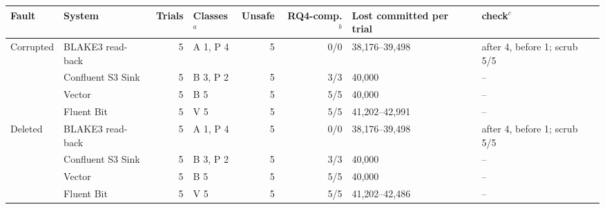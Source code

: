 
\begin{tabular}{@{}llrlrrll@{}}
\toprule
Fault & System & Trials & Classes$^a$ & Unsafe & RQ4-comp.$^b$ & Lost committed per trial & \sysname{} check$^c$ \\
\midrule
Corrupted & \sysname{} BLAKE3 read-back & 5 & A 1, P 4 & 5 & 0/0 & 38{,}176--39{,}498 & after 4, before 1; scrub 5/5 \\
 & Confluent S3 Sink & 5 & B 3, P 2 & 5 & 3/3 & 40{,}000 & -- \\
 & Vector & 5 & B 5 & 5 & 5/5 & 40{,}000 & -- \\
 & Fluent Bit & 5 & V 5 & 5 & 5/5 & 41{,}202--42{,}991 & -- \\
\addlinespace[1pt]
Deleted & \sysname{} BLAKE3 read-back & 5 & A 1, P 4 & 5 & 0/0 & 38{,}176--39{,}498 & after 4, before 1; scrub 5/5 \\
 & Confluent S3 Sink & 5 & B 3, P 2 & 5 & 3/3 & 40{,}000 & -- \\
 & Vector & 5 & B 5 & 5 & 5/5 & 40{,}000 & -- \\
 & Fluent Bit & 5 & V 5 & 5 & 5/5 & 41{,}202--42{,}486 & -- \\
\bottomrule
\end{tabular}
